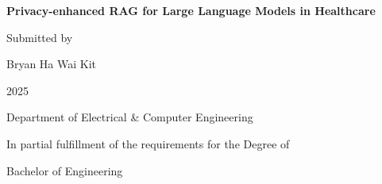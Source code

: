 \begin{titlepage}
	\centering

	\vspace*{3cm} %

	\Huge \textbf{Privacy-enhanced RAG for Large Language Models in Healthcare} %

	\vspace*{3cm} %

	\Large Submitted by

	\vspace*{0.5cm}

	\Large {Bryan Ha Wai Kit} %

	\vspace*{0.5cm}

	\Large 2025 %

	\vspace*{3.5cm} %

	\Large Department of Electrical \& Computer Engineering

	\vspace*{4cm} %

	\Large In partial fulfillment of the requirements for the Degree of

	\vspace*{0.5cm}

	\Large Bachelor of Engineering
\end{titlepage}
